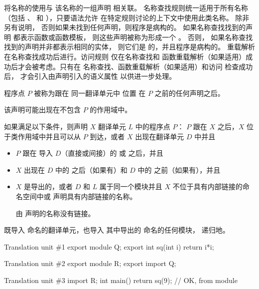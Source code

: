 \pnum
{} 将名称的使用与
该名称的一组声明 相关联。
名称查找规则统一适用于所有名称（包括
、
 和
），只要语法允许
在特定规则讨论的上下文中使用此类名称。
除非另有说明，
否则如果未找到任何声明，则程序是病构的。
如果名称查找找到的声明
都表示函数或函数模板，
则这些声明被称为形成一个 。
否则，
如果名称查找找到的声明并非都表示相同的实体，
则它们是  的，并且程序是病构的。
重载解析
在名称查找成功后进行。访问规则
仅在名称查找和
函数重载解析（如果适用）成功后才会被考虑。只有在
名称查找、函数重载解析（如果适用）和访问
检查成功后，
才会引入由声明引入的语义属性
以供进一步处理。

\pnum
程序点 $P$ 被称为跟在
同一翻译单元中
位置 在 $P$ 之前的任何声明之后。
\begin{note}
该声明可能出现在不包含 $P$ 的作用域中。
\end{note}
%
如果满足以下条件，则声明 $X$ 
翻译单元 $L$ 中的程序点 $P$：
$P$ 跟在 $X$ 之后，$X$ 位于类作用域中并且可以从 $P$ 到达，或者
$X$ 出现在翻译单元 $D$ 中并且
\begin{itemize}
\item
$P$ 跟在
导入 $D$（直接或间接）的  或  之后，并且
\item
$X$ 出现在 $D$ 中的  之后（如果有）和
$D$ 中的  之前（如果有），并且
\item
$X$ 是导出的，或者 $D$ 和 $L$ 属于同一个模块并且
$X$ 不位于具有内部链接的命名空间中或
声明具有内部链接的名称。
\begin{note}
由  声明的名称没有链接。
\end{note}
\end{itemize}
\begin{note}
 既导入
命名的翻译单元，也导入
其中导出的  命名的任何模块，
递归地。
\begin{example}
\begin{codeblocktu}{Translation unit \#1}
export module Q;
export int sq(int i) { return i*i; }
\end{codeblocktu}

\begin{codeblocktu}{Translation unit \#2}
export module R;
export import Q;
\end{codeblocktu}

\begin{codeblocktu}{Translation unit \#3}
import R;
int main() { return sq(9); }    // OK,  from module 
\end{codeblocktu}
\end{example}
\end{note}

